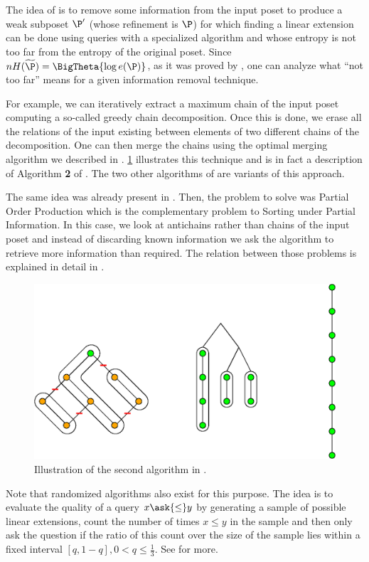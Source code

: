 The idea of \citet*{cardinal:2013} is to remove some information from the input
poset to produce a weak subposet \(\P'\) (whose refinement is \(\P\)) for which
finding a linear extension can be done using  queries with a
specialized algorithm and whose entropy is not too far from the entropy of the
original poset. Since \(n H(\widetilde{\P}) = \BigTheta{\log e(\P)}\), as it
was proved by \citet*{kahn:1995}, one can analyze what ``not too far'' means
for a given information removal technique.

For example, we can iteratively extract a maximum chain of the input poset
computing a so-called greedy chain decomposition. Once this is done, we
erase all the relations of the input existing between elements of two different
chains of the decomposition. One can then merge the chains using the optimal
merging algorithm we described in .
\ref{fig:supi/alg2} illustrates this technique and is in fact a description of
Algorithm \textbf{2} of \citet{cardinal:2013}. The two other algorithms of
\citet*{cardinal:2013} are variants of this approach.

The same idea was already present in \citet*{cardinal:2010}. Then, the problem
to solve was Partial Order Production which is the complementary problem to
Sorting under Partial Information. In this case, we look at antichains rather
than chains of the input poset and instead of discarding known information we ask
the algorithm to retrieve more information than required. The relation between
those problems is explained in detail in \cite{DBLP:conf/birthday/CardinalF13}.

\begin{figure}
	\centering
	\includegraphics[height=0.2\textheight]{fig/supi/reduction:diag}
	\caption{\label{fig:supi/alg2} Illustration of the second algorithm in
\citet*{cardinal:2013}.}
\end{figure}


Note that randomized algorithms also exist for this purpose. The idea is to
evaluate the quality of a query \(x \ask{\le} y\) by generating a sample of possible linear
extensions, count the number of times \(x \le y\) in the sample
and then only ask the question if the ratio of
this count over the size of the sample lies within a
fixed interval $[q, 1-q], 0 < q \le \frac{1}{3}$. See \citet*{huber2006fast} for
more.

